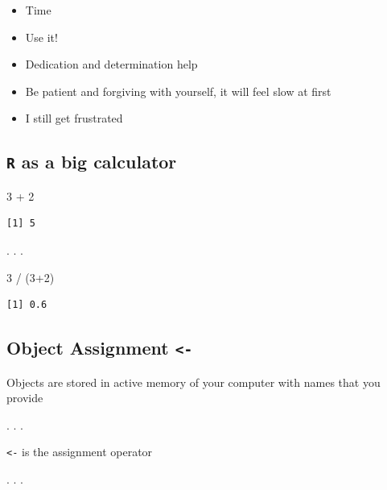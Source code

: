 \documentclass[
  letterpaper,
  DIV=11,
  numbers=noendperiod,
  oneside]{scrartcl}
\newenvironment{Shaded}{\begin{snugshade}}{\end{snugshade}}
\newcommand{\DecValTok}[1]{\textcolor[rgb]{0.68,0.00,0.00}{#1}}
\newcommand{\NormalTok}[1]{\textcolor[rgb]{0.00,0.23,0.31}{#1}}
\newcommand{\SpecialCharTok}[1]{\textcolor[rgb]{0.37,0.37,0.37}{#1}}
\providecommand{\tightlist}{%
  \setlength{\itemsep}{0pt}\setlength{\parskip}{0pt}}\usepackage{longtable,booktabs,array}
\begin{document}
\begin{itemize}
\tightlist
\item
  Time
\item
  Use it!
\item
  Dedication and determination help
\item
  Be patient and forgiving with yourself, it will feel slow at first
\item
  I still get frustrated
\end{itemize}

\hypertarget{r-as-a-big-calculator}{%
\subsection{\texorpdfstring{\texttt{R} as a big
calculator}{R as a big calculator}}\label{r-as-a-big-calculator}}

\begin{Shaded}
\begin{Highlighting}[]
\DecValTok{3} \SpecialCharTok{+} \DecValTok{2}
\end{Highlighting}
\end{Shaded}

\begin{verbatim}
[1] 5
\end{verbatim}

. . .

\begin{Shaded}
\begin{Highlighting}[]
\DecValTok{3} \SpecialCharTok{/}\NormalTok{ (}\DecValTok{3}\SpecialCharTok{+}\DecValTok{2}\NormalTok{)}
\end{Highlighting}
\end{Shaded}

\begin{verbatim}
[1] 0.6
\end{verbatim}

\hypertarget{object-assignment--}{%
\subsection{\texorpdfstring{Object Assignment
\texttt{\textless{}-}}{Object Assignment \textless-}}\label{object-assignment--}}

Objects are stored in active memory of your computer with names that you
provide

. . .

\texttt{\textless{}-} is the assignment operator

. . .
\end{document}

